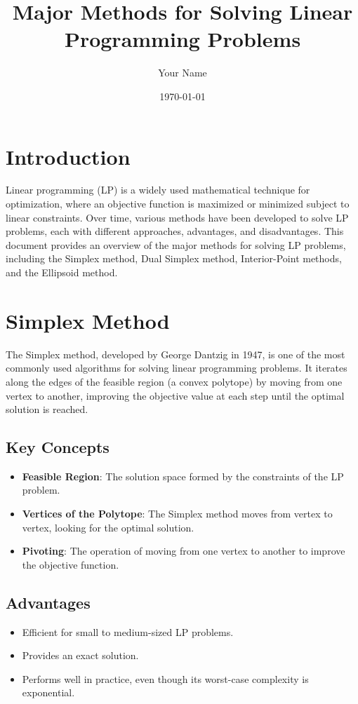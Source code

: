 \documentclass{article}
\title{Major Methods for Solving Linear Programming Problems}
\author{Your Name}
\date{\today}
\begin{document}
\maketitle

\tableofcontents

\newpage

\section{Introduction}
Linear programming (LP) is a widely used mathematical technique for optimization, where an objective function is maximized or minimized subject to linear constraints. Over time, various methods have been developed to solve LP problems, each with different approaches, advantages, and disadvantages. This document provides an overview of the major methods for solving LP problems, including the Simplex method, Dual Simplex method, Interior-Point methods, and the Ellipsoid method.

\section{Simplex Method}
The Simplex method, developed by George Dantzig in 1947, is one of the most commonly used algorithms for solving linear programming problems. It iterates along the edges of the feasible region (a convex polytope) by moving from one vertex to another, improving the objective value at each step until the optimal solution is reached.

\subsection{Key Concepts}
\begin{itemize}
    \item \textbf{Feasible Region}: The solution space formed by the constraints of the LP problem.
    \item \textbf{Vertices of the Polytope}: The Simplex method moves from vertex to vertex, looking for the optimal solution.
    \item \textbf{Pivoting}: The operation of moving from one vertex to another to improve the objective function.
\end{itemize}

\subsection{Advantages}
\begin{itemize}
    \item Efficient for small to medium-sized LP problems.
    \item Provides an exact solution.
    \item Performs well in practice, even though its worst-case complexity is exponential.
\end{itemize}
\end{document}
